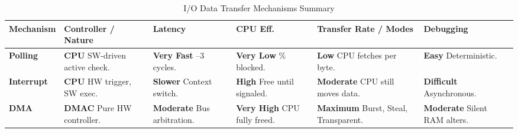 \documentclass[10pt]{article}
\begin{document}
\begin{table}[H]
    \centering
    \footnotesize 
    \renewcommand{\arraystretch}{1.2} 
    \begin{tabular}{@{} l p{2.5cm} p{1.8cm} p{2cm} p{3.2cm} p{2cm} @{}}
        \toprule
        \textbf{Mechanism} & \textbf{Controller / Nature} & \textbf{Latency} & \textbf{CPU Eff.} & \textbf{Transfer Rate / Modes} & \textbf{Debugging} \\
        \midrule
        \textbf{Polling} & 
        \textbf{CPU} \newline SW-driven active check. & 
        \textbf{Very Fast} \newline 1--3 cycles. & 
        \textbf{Very Low} \newline 100\% blocked. & 
        \textbf{Low} \newline CPU fetches per byte. & 
        \textbf{Easy} \newline Deterministic. \\
        
        \textbf{Interrupt} & 
        \textbf{CPU} \newline HW trigger, SW exec. & 
        \textbf{Slower} \newline Context switch. & 
        \textbf{High} \newline Free until signaled. & 
        \textbf{Moderate} \newline CPU still moves data. & 
        \textbf{Difficult} \newline Asynchronous. \\
        
        \textbf{DMA} & 
        \textbf{DMAC} \newline Pure HW controller. & 
        \textbf{Moderate} \newline Bus arbitration. & 
        \textbf{Very High} \newline CPU fully freed. & 
        \textbf{Maximum} \newline Burst, Steal, Transparent. & 
        \textbf{Moderate} \newline Silent RAM alters. \\
        \bottomrule
    \end{tabular}
    \caption{I/O Data Transfer Mechanisms Summary}
\end{table}
\end{document}
